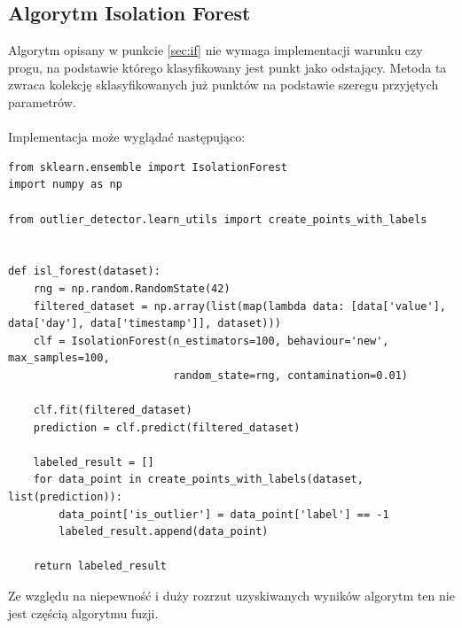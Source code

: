 \documentclass[eng,printmode]{mgr}
\begin{document}
\subsection{Algorytm Isolation Forest}
Algorytm opisany w punkcie \ref{sec:if} nie wymaga implementacji warunku czy progu, na podstawie którego klasyfikowany jest punkt jako odstający. Metoda ta zwraca kolekcję sklasyfikowanych już punktów na podstawie szeregu przyjętych parametrów.
\\\\
Implementacja może wyglądać następująco:
\\
\begin{lstlisting}
from sklearn.ensemble import IsolationForest
import numpy as np

from outlier_detector.learn_utils import create_points_with_labels


def isl_forest(dataset):
    rng = np.random.RandomState(42)
    filtered_dataset = np.array(list(map(lambda data: [data['value'], data['day'], data['timestamp']], dataset)))
    clf = IsolationForest(n_estimators=100, behaviour='new', max_samples=100,
                          random_state=rng, contamination=0.01)

    clf.fit(filtered_dataset)
    prediction = clf.predict(filtered_dataset)

    labeled_result = []
    for data_point in create_points_with_labels(dataset, list(prediction)):
        data_point['is_outlier'] = data_point['label'] == -1
        labeled_result.append(data_point)

    return labeled_result
\end{lstlisting}


Ze względu na niepewność i duży rozrzut uzyskiwanych wyników algorytm ten nie jest częścią algorytmu fuzji.
\end{document}
